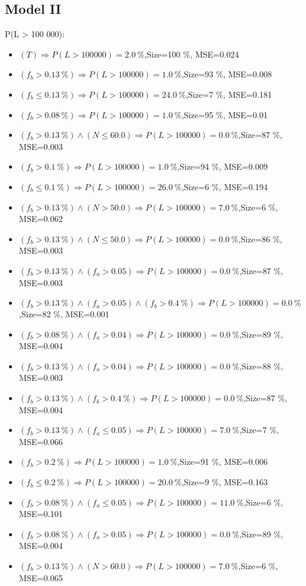 \documentclass[numbered]{CSL}
\begin{document}
\subsection{Model II}
P(L > 100 000):
\begin{itemize}
\item $(T) \Rightarrow P(L > 100 000) = 2.0~\%$,\hfill Size=100 \%, MSE=0.024
\item $(f_b > 0.13~\%) \Rightarrow P(L > 100 000) = 1.0~\%$,\hfill Size=93 \%, MSE=0.008
\item $(f_b \leq 0.13~\%) \Rightarrow P(L > 100 000) = 24.0~\%$,\hfill Size=7 \%, MSE=0.181
\item $(f_b > 0.08~\%) \Rightarrow P(L > 100 000) = 1.0~\%$,\hfill Size=95 \%, MSE=0.01
\item $(f_b > 0.13~\%) \land (N \leq 60.0) \Rightarrow P(L > 100 000) = 0.0~\%$,\hfill Size=87 \%, MSE=0.003
\item $(f_b > 0.1~\%) \Rightarrow P(L > 100 000) = 1.0~\%$,\hfill Size=94 \%, MSE=0.009
\item $(f_b \leq 0.1~\%) \Rightarrow P(L > 100 000) = 26.0~\%$,\hfill Size=6 \%, MSE=0.194
\item $(f_b > 0.13~\%) \land (N > 50.0) \Rightarrow P(L > 100 000) = 7.0~\%$,\hfill Size=6 \%, MSE=0.062
\item $(f_b > 0.13~\%) \land (N \leq 50.0) \Rightarrow P(L > 100 000) = 0.0~\%$,\hfill Size=86 \%, MSE=0.003
\item $(f_b > 0.13~\%) \land (f_a > 0.05) \Rightarrow P(L > 100 000) = 0.0~\%$,\hfill Size=87 \%, MSE=0.003
\item $(f_b > 0.13~\%) \land (f_a > 0.05) \land (f_b > 0.4~\%) \Rightarrow P(L > 100 000) = 0.0~\%$,\hfill Size=82 \%, MSE=0.001
\item $(f_b > 0.08~\%) \land (f_a > 0.04) \Rightarrow P(L > 100 000) = 0.0~\%$,\hfill Size=89 \%, MSE=0.004
\item $(f_b > 0.13~\%) \land (f_a > 0.04) \Rightarrow P(L > 100 000) = 0.0~\%$,\hfill Size=88 \%, MSE=0.003
\item $(f_b > 0.13~\%) \land (f_b > 0.4~\%) \Rightarrow P(L > 100 000) = 0.0~\%$,\hfill Size=87 \%, MSE=0.004
\item $(f_b > 0.13~\%) \land (f_a \leq 0.05) \Rightarrow P(L > 100 000) = 7.0~\%$,\hfill Size=7 \%, MSE=0.066
\item $(f_b > 0.2~\%) \Rightarrow P(L > 100 000) = 1.0~\%$,\hfill Size=91 \%, MSE=0.006
\item $(f_b \leq 0.2~\%) \Rightarrow P(L > 100 000) = 20.0~\%$,\hfill Size=9 \%, MSE=0.163
\item $(f_b > 0.08~\%) \land (f_a \leq 0.05) \Rightarrow P(L > 100 000) = 11.0~\%$,\hfill Size=6 \%, MSE=0.101
\item $(f_b > 0.08~\%) \land (f_a > 0.05) \Rightarrow P(L > 100 000) = 0.0~\%$,\hfill Size=89 \%, MSE=0.004
\item $(f_b > 0.13~\%) \land (N > 60.0) \Rightarrow P(L > 100 000) = 7.0~\%$,\hfill Size=6 \%, MSE=0.065
\end{itemize}
\end{document}
